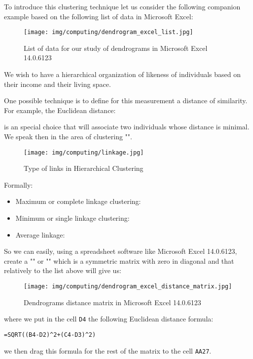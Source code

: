 	To introduce this clustering technique let us consider the following companion example based on the following list of data in Microsoft Excel:
	\begin{figure}[H]
		\centering
		\texttt{[image: img/computing/dendrogram\_excel\_list.jpg]}
		\caption[]{List of data for our study of dendrograms in Microsoft Excel 14.0.6123}
	\end{figure}
	We wish to have a hierarchical organization of likeness of individuals based on their income and their living space. 

	One possible technique is to define for this measurement a distance of similarity. For example, the Euclidean distance:
	
	is an special choice that will associate two individuals whose distance is minimal. We speak then in the area of clustering "".
	\begin{figure}[H]
		\centering
		\texttt{[image: img/computing/linkage.jpg]}
		\caption{Type of links in Hierarchical Clustering}
	\end{figure}
	Formally:
	\begin{itemize}
		\item Maximum or complete linkage clustering:
		
	
		\item Minimum or single linkage clustering:
		
	
		\item Average linkage:
		
	\end{itemize}
	So we can easily, using a spreadsheet software like Microsoft Excel 14.0.6123, create a "" or "" which is a symmetric matrix with zero in diagonal and that relatively to the list above will give us:
	\begin{figure}[H]
		\centering
		\texttt{[image: img/computing/dendrogram\_excel\_distance\_matrix.jpg]}
		\caption[]{Dendrograms distance matrix in Microsoft Excel 14.0.6123}
	\end{figure}
	where we put in the cell \texttt{D4} the following Euclidean distance formula:
	\begin{center}
		\texttt{=SQRT((B4-D2)\string^2+(C4-D3)\string^2)}
	\end{center}
	we then drag this formula for the rest of the matrix to the cell \texttt{AA27}.

